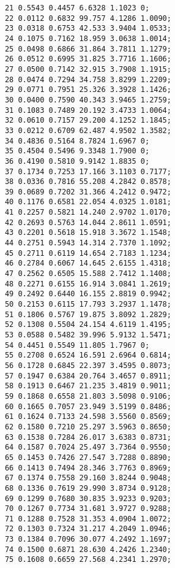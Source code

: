 \documentclass[a4paper,14pt]{extarticle} %
\begin{document}
\begin{verbatim}
	        21 0.5543 0.4457 6.6328 1.1023 0;
	        22 0.0112 0.6832 99.757 4.1286 1.0090;
	        23 0.0318 0.6753 42.533 3.9404 1.0533;
	        24 0.1075 0.7162 18.959 3.0638 1.0014;
	        25 0.0498 0.6866 31.864 3.7811 1.1279;
	        26 0.0512 0.6995 31.825 3.7716 1.1606;
	        27 0.0500 0.7142 32.915 3.7908 1.1915;
	        28 0.0474 0.7294 34.758 3.8299 1.2209;
	        29 0.0771 0.7951 25.326 3.3928 1.1426;
	        30 0.0400 0.7590 40.343 3.9465 1.2759;
	        31 0.1083 0.7489 20.192 3.4733 1.0064;
	        32 0.0610 0.7157 29.200 4.1252 1.1845;
	        33 0.0212 0.6709 62.487 4.9502 1.3582;
	        34 0.4836 0.5164 8.7824 1.6967 0;
	        35 0.4504 0.5496 9.3348 1.7900 0;
	        36 0.4190 0.5810 9.9142 1.8835 0;
	        37 0.1734 0.7253 17.166 3.1103 0.7177;
	        38 0.0336 0.7816 55.208 4.2842 0.8578;
	        39 0.0689 0.7202 31.366 4.2412 0.9472;
	        40 0.1176 0.6581 22.054 4.0325 1.0181;
	        41 0.2257 0.5821 14.240 2.9702 1.0170;
	        42 0.2693 0.5763 14.044 2.8611 1.0591;
	        43 0.2201 0.5618 15.918 3.3672 1.1548;
	        44 0.2751 0.5943 14.314 2.7370 1.1092;
	        45 0.2711 0.6119 14.654 2.7183 1.1234;
	        46 0.2784 0.6067 14.645 2.6155 1.4318;
	        47 0.2562 0.6505 15.588 2.7412 1.1408;
	        48 0.2271 0.6155 16.914 3.0841 1.2619;
	        49 0.2492 0.6440 16.155 2.8819 0.9942;
	        50 0.2153 0.6115 17.793 3.2937 1.1478;
	        51 0.1806 0.5767 19.875 3.8092 1.2829;
	        52 0.1308 0.5504 24.154 4.6119 1.4195;
	        53 0.0588 0.5482 39.996 5.9132 1.5471;
	        54 0.4451 0.5549 11.805 1.7967 0;
	        55 0.2708 0.6524 16.591 2.6964 0.6814;
	        56 0.1728 0.6845 22.397 3.4595 0.8073;
	        57 0.1947 0.6384 20.764 3.4657 0.8911;
	        58 0.1913 0.6467 21.235 3.4819 0.9011;
	        59 0.1868 0.6558 21.803 3.5098 0.9106;
	        60 0.1665 0.7057 23.949 3.5199 0.8486;
	        61 0.1624 0.7133 24.598 3.5560 0.8569;
	        62 0.1580 0.7210 25.297 3.5963 0.8650;
	        63 0.1538 0.7284 26.017 3.6383 0.8731;
	        64 0.1587 0.7024 25.497 3.7364 0.9550;
	        65 0.1453 0.7426 27.547 3.7288 0.8890;
	        66 0.1413 0.7494 28.346 3.7763 0.8969;
	        67 0.1374 0.7558 29.160 3.8244 0.9048;
	        68 0.1336 0.7619 29.990 3.8734 0.9128;
	        69 0.1299 0.7680 30.835 3.9233 0.9203;
	        70 0.1267 0.7734 31.681 3.9727 0.9288;
	        71 0.1288 0.7528 31.353 4.0904 1.0072;
	        72 0.1303 0.7324 31.217 4.2049 1.0946;
	        73 0.1384 0.7096 30.077 4.2492 1.1697;
	        74 0.1500 0.6871 28.630 4.2426 1.2340;
	        75 0.1608 0.6659 27.568 4.2341 1.2970;

\end{verbatim}
\end{document}
